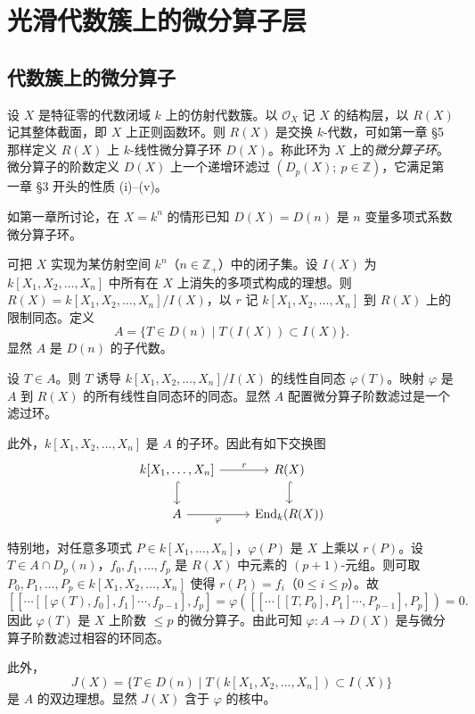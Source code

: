 \chapter{光滑代数簇上的微分算子层}

\section{代数簇上的微分算子}

设 $X$ 是特征零的代数闭域 $k$ 上的仿射代数簇。以 $\mathcal{O}_X$ 记 $X$ 的结构层，以 $R(X)$ 记其整体截面，即 $X$ 上正则函数环。则 $R(X)$ 是交换 $k$-代数，可如第一章 §5 那样定义 $R(X)$ 上 $k$-线性微分算子环 $D(X)$。称此环为 $X$ 上的\emph{微分算子环}。微分算子的阶数定义 $D(X)$ 上一个递增环滤过 $(D_p(X);\ p\in\mathbb{Z})$，它满足第一章 §3 开头的性质 (i)--(v)。

如第一章所讨论，在 $X=k^n$ 的情形已知 $D(X)=D(n)$ 是 $n$ 变量多项式系数微分算子环。

可把 $X$ 实现为某仿射空间 $k^n$（$n\in\mathbb{Z}_+$）中的闭子集。设 $I(X)$ 为 $k[X_1,X_2,\dots,X_n]$ 中所有在 $X$ 上消失的多项式构成的理想。则 $R(X)=k[X_1,X_2,\dots,X_n]/I(X)$，以 $r$ 记 $k[X_1,X_2,\dots,X_n]$ 到 $R(X)$ 上的限制同态。定义
$$A=\{T\in D(n)\mid T(I(X))\subset I(X)\}.$$
显然 $A$ 是 $D(n)$ 的子代数。

设 $T\in A$。则 $T$ 诱导 $k[X_1,X_2,\dots,X_n]/I(X)$ 的线性自同态 $\varphi(T)$。映射 $\varphi$ 是 $A$ 到 $R(X)$ 的所有线性自同态环的同态。显然 $A$ 配置微分算子阶数滤过是一个滤过环。

此外，$k[X_1,X_2,\dots,X_n]$ 是 $A$ 的子环。因此有如下交换图
$$\begin{tikzcd}
k[X_1,\dots,X_n] \arrow[r,"r"] \arrow[d,hook] & R(X) \arrow[d,hook]\\
A \arrow[r,"\varphi"'] & \End_k(R(X))
\end{tikzcd}$$

特别地，对任意多项式 $P\in k[X_1,\dots,X_n]$，$\varphi(P)$ 是 $X$ 上乘以 $r(P)$。设 $T\in A\cap D_p(n)$，$f_0,f_1,\dots,f_p$ 是 $R(X)$ 中元素的 $(p+1)$-元组。则可取 $P_0,P_1,\dots,P_p\in k[X_1,X_2,\dots,X_n]$ 使得 $r(P_i)=f_i$（$0\le i\le p$）。故
$$[[\cdots[[\varphi(T),f_0],f_1]\cdots,f_{p-1}],f_p]=\varphi([[\cdots[[T,P_0],P_1]\cdots,P_{p-1}],P_p])=0.$$
因此 $\varphi(T)$ 是 $X$ 上阶数 $\le p$ 的微分算子。由此可知 $\varphi:A\to D(X)$ 是与微分算子阶数滤过相容的环同态。

此外，
$$J(X)=\{T\in D(n)\mid T(k[X_1,X_2,\dots,X_n])\subset I(X)\}$$
是 $A$ 的双边理想。显然 $J(X)$ 含于 $\varphi$ 的核中。

